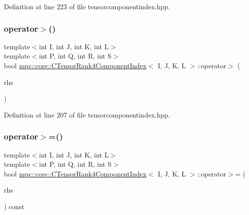 Definition at line 223 of file tensorcomponentindex.\+hpp.

\mbox{\label{classmpc_1_1core_1_1_c_tensor_rank4_component_index_ad15773f0dd7b0e1e766c91fd79ab3d8d}} 
\subsubsection{\texorpdfstring{operator$>$()}{operator>()}}
{\footnotesize\ttfamily template$<$int I, int J, int K, int L$>$ \\
template$<$int P, int Q, int R, int S$>$ \\
bool \mbox{\hyperlink{classmpc_1_1core_1_1_c_tensor_rank4_component_index}{mpc\+::core\+::\+C\+Tensor\+Rank4\+Component\+Index}}$<$ I, J, K, L $>$\+::operator$>$ (\begin{DoxyParamCaption}\item[{const \mbox{\hyperlink{classmpc_1_1core_1_1_c_tensor_rank4_component_index}{C\+Tensor\+Rank4\+Component\+Index}}$<$ P, Q, R, S $>$ \&}]{rhs }\end{DoxyParamCaption})\hspace{0.3cm}{\ttfamily [inline]}}



Definition at line 207 of file tensorcomponentindex.\+hpp.

\mbox{\label{classmpc_1_1core_1_1_c_tensor_rank4_component_index_a630f35ebccdd18cce4b71aecc1df4936}} 
\subsubsection{\texorpdfstring{operator$>$=()}{operator>=()}}
{\footnotesize\ttfamily template$<$int I, int J, int K, int L$>$ \\
template$<$int P, int Q, int R, int S$>$ \\
bool \mbox{\hyperlink{classmpc_1_1core_1_1_c_tensor_rank4_component_index}{mpc\+::core\+::\+C\+Tensor\+Rank4\+Component\+Index}}$<$ I, J, K, L $>$\+::operator$>$= (\begin{DoxyParamCaption}\item[{const \mbox{\hyperlink{classmpc_1_1core_1_1_c_tensor_rank4_component_index}{C\+Tensor\+Rank4\+Component\+Index}}$<$ P, Q, R, S $>$ \&}]{rhs }\end{DoxyParamCaption}) const\hspace{0.3cm}{\ttfamily [inline]}}



